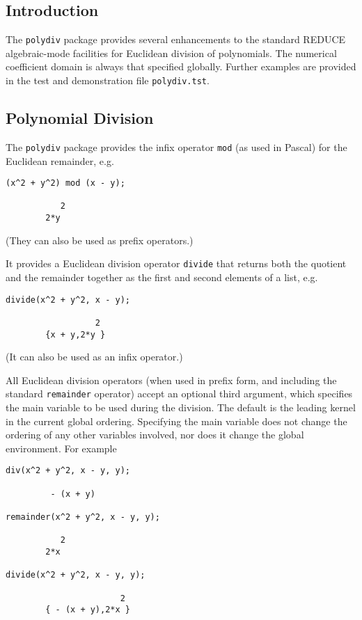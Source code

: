 
\subsection{Introduction}

The \texttt{polydiv} package provides several enhancements to the
standard REDUCE algebraic-mode facilities for Euclidean division of
polynomials.
The numerical coefficient domain is always that specified globally.
Further examples are provided in the test and demonstration file
\texttt{polydiv.tst}.


\subsection{Polynomial Division}

The \texttt{polydiv} package provides
the infix operator \texttt{mod} (as used in Pascal) for the Euclidean %
remainder, e.g.
%
\begin{verbatim}
(x^2 + y^2) mod (x - y);

           2
        2*y
\end{verbatim}
(They can also be used as prefix operators.)

It provides a Euclidean division operator \texttt{divide} that returns
both the quotient and the remainder together as the first and second
elements of a list, e.g.
\begin{verbatim}
divide(x^2 + y^2, x - y);

                  2
        {x + y,2*y }
\end{verbatim}
(It can also be used as an infix operator.)

All Euclidean division operators (when used in prefix form, and
including the standard \texttt{remainder} operator) accept an optional
third argument, which specifies the main variable to be used during
the division.  The default is the leading kernel in the current global
ordering.  Specifying the main variable does not change the ordering
of any other variables involved, nor does it change the global
environment.  For example
\begin{verbatim}
div(x^2 + y^2, x - y, y);

         - (x + y)

remainder(x^2 + y^2, x - y, y);

           2
        2*x

divide(x^2 + y^2, x - y, y);

                       2
        { - (x + y),2*x }
\end{verbatim}

